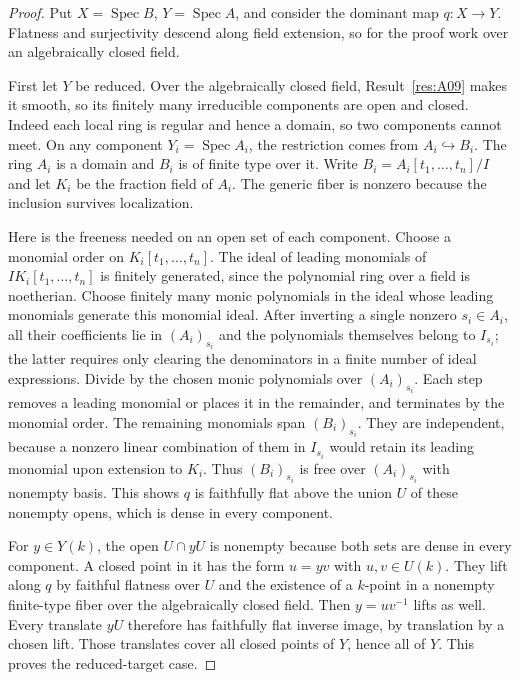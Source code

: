 \documentclass[11pt,a4paper,openany,oneside]{book}
\theoremstyle{resultstyle}
\theoremstyle{definition}
\numberwithin{equation}{chapter}
\begin{document}
\begin{proof}
Put \(X=\operatorname{Spec}B\), \(Y=\operatorname{Spec}A\), and consider
the dominant map \(q:X\to Y\). Flatness and surjectivity descend along
field extension, so for the proof work over an algebraically closed field.

First let \(Y\) be reduced. Over the algebraically closed field,
Result~\ref{res:A09} makes it smooth, so its finitely many
irreducible components are open and closed. Indeed each local
ring is regular and hence a domain, so two components cannot meet.
On any component \(Y_i=\operatorname{Spec}A_i\), the restriction
comes from \(A_i\hookrightarrow B_i\). The ring \(A_i\) is a domain
and \(B_i\) is of finite type over it. Write
\(B_i=A_i[t_1,\ldots,t_n]/I\) and let \(K_i\) be the fraction
field of \(A_i\). The generic fiber is nonzero because the
inclusion survives localization.

Here is the freeness needed on an open set of each component.
Choose a monomial order on \(K_i[t_1,\ldots,t_n]\). The ideal
of leading monomials of \(I K_i[t_1,\ldots,t_n]\) is finitely
generated, since the polynomial ring over a field is noetherian.
Choose finitely many monic polynomials in the ideal whose leading
monomials generate this monomial ideal. After inverting a single
nonzero \(s_i\in A_i\), all their coefficients lie in
\((A_i)_{s_i}\) and the polynomials themselves belong to \(I_{s_i}\);
the latter requires only clearing the denominators in a finite
number of ideal expressions. Divide by the chosen monic polynomials
over \((A_i)_{s_i}\). Each step removes a leading monomial or places
it in the remainder, and terminates by the monomial order.
The remaining monomials span \((B_i)_{s_i}\). They are independent,
because a nonzero linear combination of them in \(I_{s_i}\)
would retain its leading monomial upon extension to \(K_i\).
Thus \((B_i)_{s_i}\) is free over \((A_i)_{s_i}\) with nonempty
basis. This shows \(q\) is faithfully flat above the union \(U\)
of these nonempty opens, which is dense in every component.

For \(y\in Y(k)\), the open \(U\cap yU\) is nonempty because both
sets are dense in every component. A closed point in it has the
form \(u=yv\) with \(u,v\in U(k)\). They lift along \(q\) by
faithful flatness over \(U\) and the existence of a \(k\)-point in
a nonempty finite-type fiber over the algebraically closed field.
Then \(y=uv^{-1}\) lifts as well. Every translate \(yU\) therefore
has faithfully flat inverse image, by translation by a chosen
lift. Those translates cover all closed points of \(Y\), hence
all of \(Y\). This proves the reduced-target case.


\end{proof}
\end{document}

